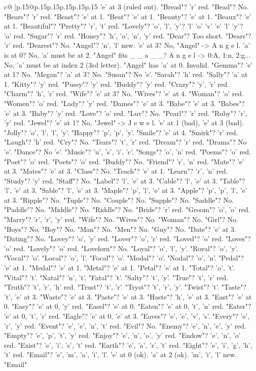 \documentclass{article}
\begin{document}
{\begin{supertabular}{c@{$\;$}|p{.15\linewidth}@{}p{.15\linewidth}p{.15\linewidth}p{.15\linewidth}p{.15\linewidth}p{.15\linewidth}}
{{{'e' at 3 (ruled out). "Bread"? 'r' red. "Bead"? No. "Bears"? 'r' red. "Beast"? 'e' at 1. "Beat"? 'e' at 1. "Beauty"? 'e' at 1. "Beaux"? 'e' at 1. "Beautiful"? "Pretty"? 'r', 't' red. "Lovely"? 'o', 'l', 'y'? 'l' 'o' 'v' 'e' 'l' 'y'? 'o' red. "Sugar"? 'r' red. "Honey"? 'h', 'o', 'n', 'y' red. "Dear"? Too short. "Dears"? 'r' red. "Dearest"? No. "Angel"? 'n', 'l' new. 'e' at 3? No, "Angel" {-}> A n g e l. 'a' is at 0? No, 'a' must be at 2. "Angel" fits \_ \_ a \_ \_? A n g e l {-}> 0:A, 1:n, 2:g... No, 'a' must be at index 2 (3rd letter). "Angel" has 'a' at 0. Invalid. "Gemma"? 'e' at 1? No. "Megan"? 'a' at 3? No. "Susan"? No 'e'. "Sarah"? 'h' red. "Sally"? 'a' at 1. "Kitty"? 'y' red. "Pussy"? 'y' red. "Buddy"? 'y' red. "Crazy"? 'y', 'r' red. "Charm"? 'h', 'r' red. "Wife"? 'e' at 3? No. "Wives"? 'e' at 4. "Woman"? 'o' red. "Women"? 'o' red. "Lady"? 'y' red. "Dames"? 'e' at 3. "Babe"? 'e' at 3. "Babes"? 'e' at 3. "Baby"? 'y' red. "Love"? 'o' red. "Luv"? No. "Pearl"? 'r' red. "Ruby"? 'r', 'y' red. "Jewel"? 'e' at 1? No, "Jewel" {-}> J e w e l. 'e' at 1 (bad), 'e' at 3 (bad). "Jolly"? 'o', 'l', 'l', 'y'. "Happy"? 'p', 'p', 'y'. "Smile"? 'e' at 4. "Smirk"? 'r' red. "Laugh"? 'h' red. "Cry"? No. "Tears"? 't', 'r' red. "Dream"? 'r' red. "Drama"? No 'e'. "Dance"? No 'e'. "Music"? 'u', 's', 'i', 'c'. "Songs"? 'o', 'n' red. "Poems"? 'o' red. "Poet"? 'o' red. "Poets"? 'o' red. "Buddy"? No. "Friend"? 'r', 'n' red. "Mate"? 'e' at 3. "Mates"? 'e' at 3. "Class"? No. "Teach"? 'e' at 1. "Learn"? 'r', 'n' red. "Study"? 'y' red. "Staff"? No. "Label"? 'l', 'e' at 3. "Cable"? 'l', 'e' at 3. "Table"? 'l', 'e' at 3. "Sable"? 'l', 'e' at 3. "Maple"? 'p', 'l', 'e' at 3. "Apple"? 'p', 'p', 'l', 'e' at 3. "Ripple"? No. "Tuple"? No. "Couple"? No. "Supple"? No. "Saddle"? No. "Paddle"? No. "Middle"? No. "Riddle"? No. "Bride"? 'r' red. "Groom"? 'o', 'o' red. "Marry"? 'r', 'r', 'y' red. "Wife"? No. "Wives"? No. "Woman"? No. "Girl"? No. "Boys"? No. "Boy"? No. "Man"? No. "Men"? No. "Guy"? No. "Date"? 'e' at 3. "Dating"? No. "Lovey"? 'o', 'y' red. "Lover"? 'o', 'r' red. "Loved"? 'o' red. "Loves"? 'o' red. "Lovely"? 'o' red. "Lovelorn"? No. "Loyal"? 'o', 'l', 'y'. "Royal"? 'o', 'y'. "Vocal"? 'o'. "Local"? 'o', 'l'. "Focal"? 'o'. "Modal"? 'o'. "Nodal"? 'o', 'n'. "Pedal"? 'e' at 1. "Medal"? 'e' at 1. "Metal"? 'e' at 1. "Petal"? 'e' at 1. "Total"? 'o', 't'. "Vital"? 't'. "Natal"? 'n', 't'. "Fatal"? 't'. "Salty"? 't', 'y'. "True"? 't', 'r' red. "Truth"? 't', 'r', 'h' red. "Trust"? 't', 'r'. "Tryst"? 't', 'r', 'y'. "Twist"? 't'. "Taste"? 't', 'e' at 3. "Waste"? 'e' at 3. "Paste"? 'e' at 3. "Haste"? 'h', 'e' at 3. "East"? 'e' at 0. "Easy"? 'e' at 0, 'y' red. "Easel"? 'e' at 0. "Eaten"? 'e' at 0, 't', 'n' red. "Eater"? 'e' at 0, 't', 'r' red. "Eagle"? 'e' at 0, 'e' at 3. "Eaves"? 'e', 'e', 'v', 's'. "Every"? 'e', 'r', 'y' red. "Event"? 'e', 'e', 'n', 't' red. "Evil"? No. "Enemy"? 'e', 'n', 'e', 'y' red. "Empty"? 'e', 'p', 't', 'y' red. "Enjoy"? 'e', 'n', 'o', 'y' red. "Endow"? 'e', 'n', 'o' red. "Exist"? 'e', 'i', 's', 't' red. "Earth"? 'e', 'a', 'r', 't' red. "Eight"? 'e', 'i', 'g', 'h', 't' red. "Email"? 'e', 'm', 'a', 'i', 'l'. 'e' at 0 (ok). 'a' at 2 (ok). 'm', 'i', 'l' new. "Email" }}}
\end{supertabular}}
\end{document}
